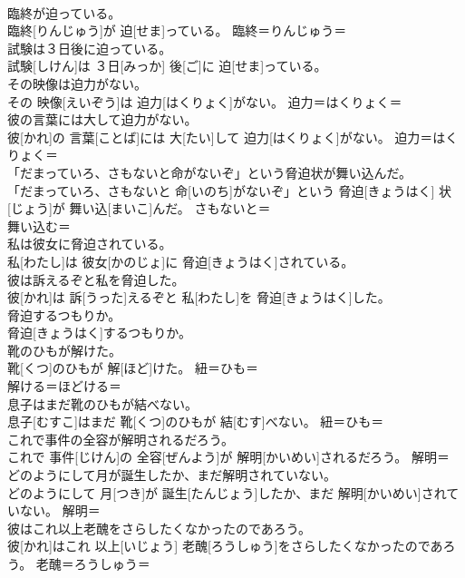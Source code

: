 \documentclass[8pt]{extreport}
\begin{document}
\begin{CJK}{UTF8}{min}
{\\	臨終が迫っている。	
\\	臨終[りんじゅう]が 迫[せま]っている。	臨終＝りんじゅう＝ 
\\	試験は３日後に迫っている。	
\\	試験[しけん]は ３日[みっか] 後[ご]に 迫[せま]っている。	
\\	その映像は迫力がない。	
\\	その 映像[えいぞう]は 迫力[はくりょく]がない。	迫力＝はくりょく＝ 
\\	彼の言葉には大して迫力がない。	
\\	彼[かれ]の 言葉[ことば]には 大[たい]して 迫力[はくりょく]がない。	迫力＝はくりょく＝ 
\\	「だまっていろ、さもないと命がないぞ」という脅迫状が舞い込んだ。	
\\	「だまっていろ、さもないと 命[いのち]がないぞ」という 脅迫[きょうはく] 状[じょう]が 舞い込[まいこ]んだ。	さもないと＝ 
\\	舞い込む＝ 
\\	私は彼女に脅迫されている。	
\\	私[わたし]は 彼女[かのじょ]に 脅迫[きょうはく]されている。	
\\	彼は訴えるぞと私を脅迫した。	
\\	彼[かれ]は 訴[うった]えるぞと 私[わたし]を 脅迫[きょうはく]した。	
\\	脅迫するつもりか。	
\\	脅迫[きょうはく]するつもりか。	
\\	靴のひもが解けた。	
\\	靴[くつ]のひもが 解[ほど]けた。	紐＝ひも＝ 
\\	解ける＝ほどける＝ 
\\	息子はまだ靴のひもが結べない。	
\\	息子[むすこ]はまだ 靴[くつ]のひもが 結[むす]べない。	紐＝ひも＝ 
\\	これで事件の全容が解明されるだろう。	
\\	これで 事件[じけん]の 全容[ぜんよう]が 解明[かいめい]されるだろう。	解明＝ 
\\	どのようにして月が誕生したか、まだ解明されていない。	
\\	どのようにして 月[つき]が 誕生[たんじょう]したか、まだ 解明[かいめい]されていない。	解明＝ 
\\	彼はこれ以上老醜をさらしたくなかったのであろう。	
\\	彼[かれ]はこれ 以上[いじょう] 老醜[ろうしゅう]をさらしたくなかったのであろう。	老醜＝ろうしゅう＝ 
}
\end{CJK}
\end{document}
